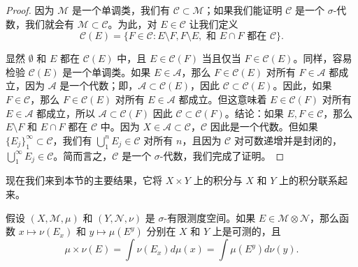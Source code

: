 \documentclass[lang=cn,10pt,thmcnt=section]{elegantbook}
\begin{document}
\begin{proof}
因为 $\mathcal{M}$ 是一个单调类，我们有 $\mathcal{C} \subset \mathcal{M}$；如果我们能证明 $\mathcal{C}$ 是一个 $\sigma$-代数，我们就会有 $\mathcal{M} \subset \mathcal{C}$。为此，对 $E \in \mathcal{C}$ 让我们定义
\[ \mathcal{C}(E) = \{F \in \mathcal{C} : E \setminus F, F \setminus E, \text{ 和 } E \cap F \text{ 都在 } \mathcal{C}\}. \]

显然 $\emptyset$ 和 $E$ 都在 $\mathcal{C}(E)$ 中，且 $E \in \mathcal{C}(F)$ 当且仅当 $F \in \mathcal{C}(E)$。同样，容易检验 $\mathcal{C}(E)$ 是一个单调类。如果 $E \in \mathcal{A}$，那么 $F \in \mathcal{C}(E)$ 对所有 $F \in \mathcal{A}$ 都成立，因为 $\mathcal{A}$ 是一个代数；即，$\mathcal{A} \subset \mathcal{C}(E)$，因此 $\mathcal{C} \subset \mathcal{C}(E)$。因此，如果 $F \in \mathcal{C}$，那么 $F \in \mathcal{C}(E)$ 对所有 $E \in \mathcal{A}$ 都成立。但这意味着 $E \in \mathcal{C}(F)$ 对所有 $E \in \mathcal{A}$ 都成立，所以 $\mathcal{A} \subset \mathcal{C}(F)$ 因此 $\mathcal{C} \subset \mathcal{C}(F)$。结论：如果 $E, F \in \mathcal{C}$，那么 $E \setminus F$ 和 $E \cap F$ 都在 $\mathcal{C}$ 中。因为 $X \in \mathcal{A} \subset \mathcal{C}$，$\mathcal{C}$ 因此是一个代数。但如果 $\{E_j\}_1^\infty \subset \mathcal{C}$，我们有 $\bigcup_1^n E_j \in \mathcal{C}$ 对所有 $n$，且因为 $\mathcal{C}$ 对可数递增并是封闭的，$\bigcup_1^\infty E_j \in \mathcal{C}$。简而言之，$\mathcal{C}$ 是一个 $\sigma$-代数，我们完成了证明。
\end{proof}

现在我们来到本节的主要结果，它将 $X \times Y$ 上的积分与 $X$ 和 $Y$ 上的积分联系起来。

\begin{theorem}\label{theorem2.36}
假设 $(X, \mathcal{M}, \mu)$ 和 $(Y, \mathcal{N}, \nu)$ 是 $\sigma$-有限测度空间。如果 $E \in \mathcal{M} \otimes \mathcal{N}$，那么函数 $x \mapsto \nu(E_x)$ 和 $y \mapsto \mu(E^y)$ 分别在 $X$ 和 $Y$ 上是可测的，且
\[ \mu \times \nu(E) = \int \nu(E_x) d\mu(x) = \int \mu(E^y) d\nu(y). \]
\end{theorem}
\end{document}
